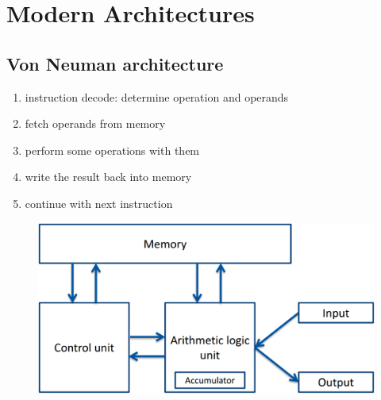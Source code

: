 \section{Modern Architectures}
    \subsection{Von Neuman architecture}
        \begin{enumerate}
            \item instruction decode: determine operation and operands
            \item fetch operands from memory
            \item perform some operations with them
            \item write the result back into memory
            \item continue with next instruction
        \end{enumerate}
        
        \begin{figure}
            \includegraphics{Von_Neuman_Architecture.png}
        \end{figure}
        
        